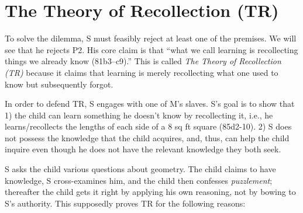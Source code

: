 \documentclass[10 pt]{article}
\begin{document}
\section*{The Theory of Recollection (TR)}
To solve the dilemma, S must feasibly reject at least one of the premises. We will see that he rejects P2. His core claim is that ``what we call learning is recollecting things we already know (81b3--c9).'' This is called \emph{The Theory of Recollection (TR)} because it claims that learning is merely recollecting what one used to know but subsequently forgot. 

In order to defend TR, S engages with one of M's slaves. S's goal is to show that 1) the child can learn something he doesn't know by recollecting it, i.e., he learns/recollects the lengths of each side of a 8 sq ft square (85d2-10). 2) S does not possess the knowledge that the child acquires, and, thus, can help the child inquire even though he does not have the relevant knowledge they both seek. 





S asks the child various questions about geometry. The child claims to have knowledge, S cross-examines him, and the child then confesses \emph{puzzlement}; thereafter the child gets it right by applying his own reasoning, not by bowing to S's authority. This supposedly proves TR for the following reasons: 
\end{document}
